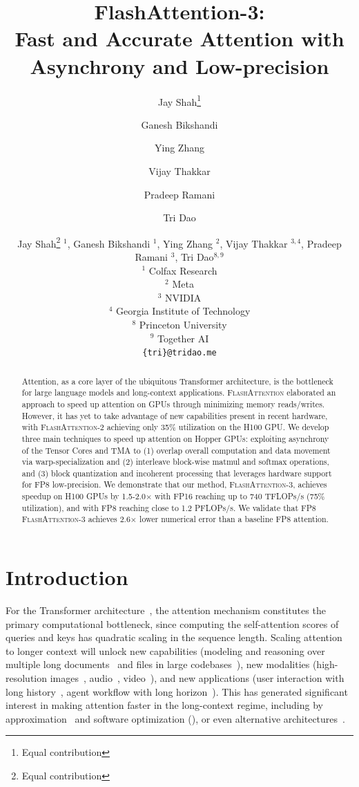\documentclass{article}
\title{FlashAttention-3:\\ Fast and Accurate Attention with Asynchrony and Low-precision}
\author[$^1$]{Jay Shah\thanks{Equal contribution}}
\author[$^1$]{Ganesh Bikshandi\samethanks}
\author[$^2$]{Ying Zhang}
\author[$^{3,4}$]{Vijay Thakkar}
\author[$^3$]{Pradeep Ramani}
\author[$^{5,6}$]{Tri Dao}
\affil[$^1$]{Colfax Research}
\affil[$^2$]{Meta}
\affil[$^3$]{NVIDIA}
\affil[$^4$]{Georgia Tech}
\affil[$^5$]{Princeton University}
\affil[$^6$]{Together AI\newline}
\affil[ ]{\hspace{-2em}{\small\texttt{\{jayhshah,ganesh\}@colfax-intl.com},
      \texttt{yingz@meta.com}, \texttt{\{vithakkar,prraman\}@nvidia.com}, \texttt{tri@tridao.me}}}
\author{%
  Jay Shah\thanks{Equal contribution}\: $^{1}$,
  Ganesh Bikshandi\samethanks\: $^{1}$, Ying Zhang $^{2}$, Vijay Thakkar $^{3,4}$,
  Pradeep Ramani $^{3}$, Tri Dao$^{8,9}$\\
  $^1$ Colfax Research\\
  $^2$ Meta\\
  $^3$ NVIDIA \\
  $^4$ Georgia Institute of Technology\\
  $^8$ Princeton University\\
  $^9$ Together AI\\
  {\small\texttt{\{tri\}@tridao.me}}
}
\newcommand{\fa}{\textsc{FlashAttention}\xspace}
\newcommand{\faa}{\textsc{FlashAttention-2}\xspace}
\newcommand{\fat}{\textsc{FlashAttention-3}\xspace}  %
\begin{document}
\maketitle


\begin{abstract}

Attention, as a core layer of the ubiquitous Transformer architecture, is the bottleneck for large language models and long-context applications.
\fa elaborated an approach to speed up attention on GPUs through minimizing memory reads/writes.
However, it has yet to take advantage of new capabilities present in recent
hardware, with \faa achieving only 35\% utilization on the H100 GPU.
We develop three main techniques to speed up attention on Hopper GPUs: exploiting
asynchrony of the Tensor Cores and TMA to (1) overlap overall computation and data movement via warp-specialization and (2) interleave block-wise matmul and softmax operations, and (3)
block quantization and incoherent processing that leverages hardware support for FP8 low-precision.
We demonstrate that our method, \fat, achieves speedup on H100 GPUs
by 1.5-2.0$\times$ with FP16 reaching up to 740 TFLOPs/s (75\% utilization), and with FP8 reaching close to 1.2
PFLOPs/s.
We validate that FP8 \fat achieves 2.6$\times$ lower numerical error than a baseline
FP8 attention.

\end{abstract}



\section{Introduction}
\label{sec:intro}

For the Transformer architecture~\citep{vaswani2017attention}, the attention mechanism constitutes the primary computational bottleneck, since computing the self-attention scores of queries and keys has quadratic scaling in the sequence length.
Scaling attention to longer context will unlock new capabilities (modeling and
reasoning over multiple long
documents~\citep{guo2021longt5,shaham2022scrolls,peng2023yarn} and files in
large codebases~\citep{roziere2023code, li2023starcoder}), new modalities (high-resolution
images~\citep{chen2022scaling}, audio~\citep{gulati2020conformer}, video~\citep{ho2022video}), and new applications (user interaction with long history~\citep{sun2019bert4rec},
agent workflow with long horizon~\citep{yao2022react}).
This has generated significant interest in making attention faster in the long-context regime, including 
by approximation~\citep{katharopoulos2020transformers,choromanski2020rethinking,
tay2020efficient} and software optimization
(\citep{rabe2021self,dao2022flashattention,kwon2023efficient}), or even alternative
architectures~\citep{peng2023rwkv,sun2023retentive,gu2023mamba}.
\end{document}
